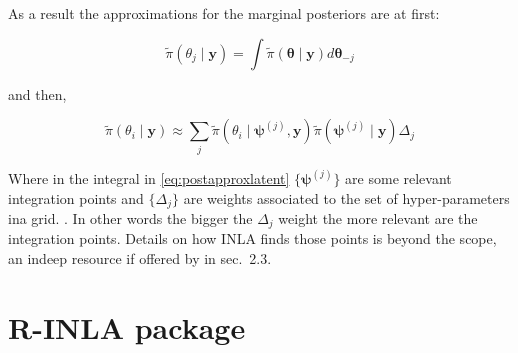 \documentclass[
  12pt,
  a4paper,
  oneside]{book}
\theoremstyle{definition}
\theoremstyle{definition}
\theoremstyle{definition}
\theoremstyle{remark}
\begin{document}
As a result the approximations for the marginal posteriors are at first:

\begin{equation}
\tilde{\pi}\left(\theta_{j} \mid \boldsymbol{\mathbf{y}}\right)=\int \tilde{\pi}(\boldsymbol{\theta} \mid \boldsymbol{\mathbf{y}}) d \boldsymbol{\theta}_{-j}
\label{eq:postapproxprior}
\end{equation}

and then,

\begin{equation}
\tilde{\pi}\left(\theta_{i} \mid \boldsymbol{\mathbf{y}}\right) \approx \sum_{j} \tilde{\pi}\left(\theta_{i} \mid \boldsymbol{\psi}^{(j)}, \boldsymbol{\mathbf{y}}\right) \tilde{\pi}\left(\boldsymbol{\psi}^{(j)} \mid \boldsymbol{\mathbf{y}}\right) \Delta_{j}
\label{eq:postapproxlatent}
\end{equation}

Where in the integral in \eqref{eq:postapproxlatent} \(\{\boldsymbol{\psi}^{(j)}\}\) are some relevant integration points and \(\{\Delta_j\}\) are weights associated to the set of hyper-parameters ina grid. \citep{Blangiardo-Cameletti}.
In other words the bigger the \(\Delta_{j}\) weight the more relevant are the integration points. Details on how INLA finds those points is beyond the scope, an indeep resource if offered by \citet{wang2018bayesian} in sec.~2.3.

\hypertarget{rinla}{%
\section{R-INLA package}\label{rinla}}
\end{document}
